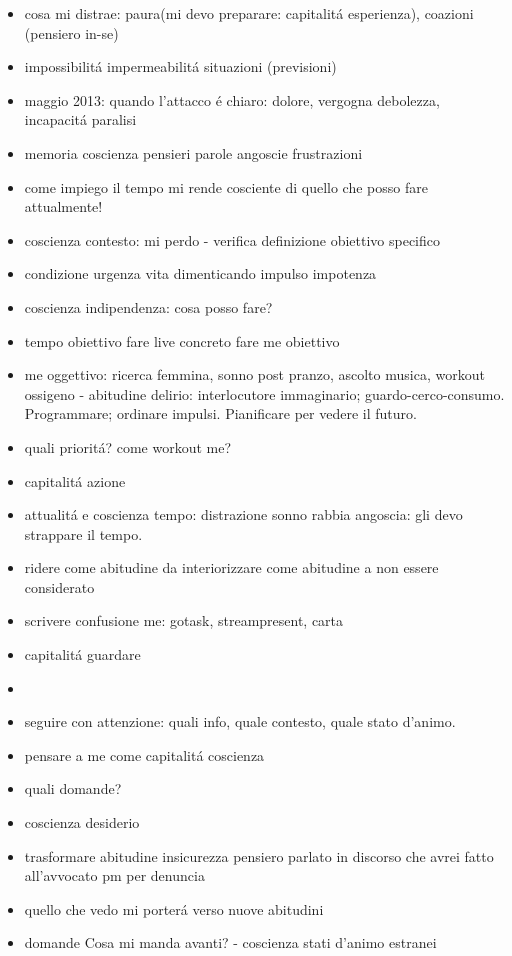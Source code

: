 \begin{itemize}
\item cosa mi distrae: paura(mi devo preparare: capitalit\'a esperienza), coazioni (pensiero in-se)
\item impossibilit\'a impermeabilit\'a situazioni (previsioni)
\item maggio 2013: quando l'attacco \'e chiaro: dolore, vergogna debolezza, incapacit\'a paralisi
\item memoria coscienza pensieri parole angoscie frustrazioni
\item come impiego il tempo mi rende cosciente di quello che posso fare attualmente!
\item coscienza contesto: mi perdo - verifica definizione obiettivo specifico
\item condizione urgenza vita dimenticando impulso impotenza
\item coscienza indipendenza: cosa posso fare?
\item tempo obiettivo fare live concreto fare me obiettivo
\item me oggettivo: ricerca femmina, sonno post pranzo, ascolto musica, workout ossigeno - abitudine delirio: interlocutore immaginario; guardo-cerco-consumo.
Programmare; ordinare impulsi. Pianificare per vedere il futuro.
\item quali priorit\'a? come workout me?
\item capitalit\'a azione
\item attualit\'a e coscienza tempo: distrazione sonno rabbia angoscia: gli devo strappare il tempo.
\item ridere come abitudine da interiorizzare come abitudine a non essere considerato
\item scrivere confusione me: gotask, streampresent, carta
\item capitalit\'a guardare
\item {}
\item seguire con attenzione: quali info, quale contesto, quale stato d'animo.
\item pensare a me come capitalit\'a coscienza
\item quali domande?
\item coscienza desiderio
\item trasformare abitudine insicurezza pensiero parlato in discorso che avrei fatto all'avvocato pm per denuncia
\item quello che vedo mi porter\'a verso nuove abitudini
\item domande
Cosa mi manda avanti? - coscienza stati d'animo estranei

\end{itemize}
